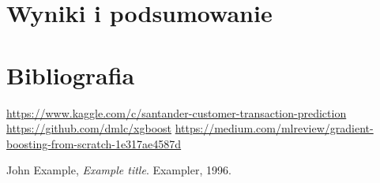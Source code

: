 \documentclass[12pt]{article}
\begin{document}
\section{Wyniki i podsumowanie}

\newpage

\section{Bibliografia}
\begin{thebibliography}{9}

\url{https://www.kaggle.com/c/santander-customer-transaction-prediction}
\url{https://github.com/dmlc/xgboost}
\url{https://medium.com/mlreview/gradient-boosting-from-scratch-1e317ae4587d}

  John Example,
  \textit{Example title}.
  Exampler,
  1996.

\end{thebibliography}
\end{document}
